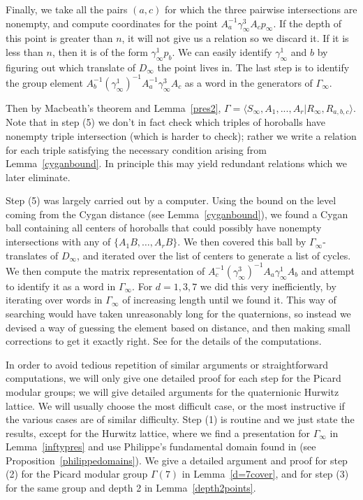 \documentclass{article}[12pt]
\begin{document}
\begin{itemize}
Finally, we take all the pairs $(a,c)$ for which the three pairwise intersections are nonempty, and compute coordinates for the point $A_a^{-1}\gamma_\infty^3 A_c p_\infty$.  If the depth of this point is greater than $n$, it will not give us a relation so we discard it.  If it is less than $n$, then it is of the form $\gamma_\infty^1 p_b$.  We can easily identify $\gamma_\infty^1$ and $b$ by figuring out which translate of $D_\infty$ the point lives in.  The last step is to identify the group element $A_b^{-1}(\gamma_\infty^1)^{-1}A_a^{-1}\gamma_\infty^3 A_c$ as a word in the generators of $\Gamma_\infty$.


\end{itemize}

Then by Macbeath's theorem and Lemma~\ref{pres2}, $\Gamma=\langle S_\infty,A_1,...,A_r \vert R_\infty, R_{a,b,c} \rangle$. Note that in step (5) we don't in fact check which triples of horoballs have nonempty triple intersection (which is harder to check); rather we write a relation for each triple satisfying the necessary condition arising from Lemma~\ref{cyganbound}.
In principle this may yield redundant relations which we later eliminate.  

Step (5) was largely carried out by a computer.  Using the bound on the level coming from the Cygan distance (see Lemma~\ref{cyganbound}), we found a Cygan ball containing all centers of horoballs that could possibly have nonempty intersections with any of $\{A_1B,\ldots, A_rB \}$.  We then covered this ball by $\Gamma_\infty$-translates of $D_\infty$, and iterated over the list of centers to generate a list of cycles.  We then compute the matrix representation of $A_c^{-1}(\gamma_\infty^3)^{-1}A_a\gamma_\infty^1A_b$ and attempt to identify it as a word in $\Gamma_\infty$.  For $d=1,3,7$ we did this very inefficiently, by iterating over words in $\Gamma_\infty$ of increasing length until we found it.  This way of searching would have taken unreasonably long for the quaternions, so instead we devised a way of guessing the element based on distance, and then making small corrections to get it exactly right. See \cite{MCode} for the details of the computations. 


\smallskip

In order to avoid tedious repetition of similar arguments or straightforward computations, we will  only give one detailed proof for each step for the Picard modular groups; we will give detailed arguments for the quaternionic Hurwitz lattice. We will usually choose the most difficult case, or the most instructive if the various cases are of similar difficulty. Step (1) is routine and we just state the results, except for the Hurwitz lattice, where we find a presentation for $\Gamma_\infty$ in Lemma~\ref{inftypres} and use Philippe's fundamental domain found in \cite{Ph} (see Proposition~\ref{philippedomains}). We give a detailed argument and proof for step (2) for the Picard modular group $\Gamma(7)$ in Lemma~\ref{d=7cover}, and for step (3) for the same group and depth 2 in Lemma~\ref{depth2points}. 
\end{document}
